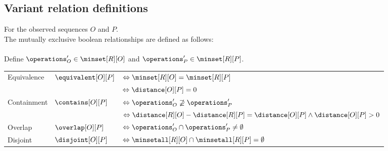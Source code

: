 \subsection*{Variant relation definitions}
%
For the observed sequences $O$ and $P$.\\
The mutually exclusive boolean relationships are defined as follows: \\
\\
Define $\operations_O' \in \minset[R][O]$ and $\operations_P' \in \minset[R][P]$.\\
%
\begin{table}[h!]
    \begin{tabular}{l l l}
        Equivalence & $\equivalent[O][P]$ & $\Leftrightarrow \minset[R][O] = \minset[R][P]$ \\
                    &                     & $\Leftrightarrow \distance[O][P] = 0$ \\
        Containment & $\contains[O][P]$   & $\Leftrightarrow \operations_O' \not\supseteq \operations_P'$ \\ %
                    &                     & $\Leftrightarrow \distance[R][O] - \distance[R][P] = \distance[O][P] \land \distance[O][P] > 0$ \\
        Overlap     & $\overlap[O][P]$    & $\Leftrightarrow \operations_O' \cap \operations_P' \ne \emptyset$ \\ %
        Disjoint   & $\disjoint[O][P]$    & $\Leftrightarrow \minsetall[R][O] \cap \minsetall[R][P] = \emptyset$ \\
    \end{tabular}
\end{table}
%
